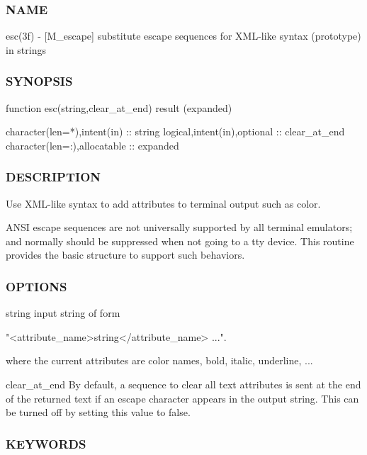 \subsubsection*{N\+A\+ME}

esc(3f) -\/ \mbox{[}M\+\_\+escape\mbox{]} substitute escape sequences for X\+M\+L-\/like syntax (prototype) in strings 

\subsubsection*{S\+Y\+N\+O\+P\+S\+IS}

\begin{DoxyVerb} function esc(string,clear_at_end) result (expanded)

   character(len=*),intent(in) :: string
   logical,intent(in),optional :: clear_at_end
   character(len=:),allocatable :: expanded
\end{DoxyVerb}


\subsubsection*{D\+E\+S\+C\+R\+I\+P\+T\+I\+ON}

Use X\+M\+L-\/like syntax to add attributes to terminal output such as color.

A\+N\+SI escape sequences are not universally supported by all terminal emulators; and normally should be suppressed when not going to a tty device. This routine provides the basic structure to support such behaviors.

\subsubsection*{O\+P\+T\+I\+O\+NS}

string input string of form \begin{DoxyVerb}            "<attribute_name>string</attribute_name> ...".

           where the current attributes are color names,
           bold, italic, underline, ...
\end{DoxyVerb}


clear\+\_\+at\+\_\+end By default, a sequence to clear all text attributes is sent at the end of the returned text if an escape character appears in the output string. This can be turned off by setting this value to false. \subsubsection*{K\+E\+Y\+W\+O\+R\+DS}

